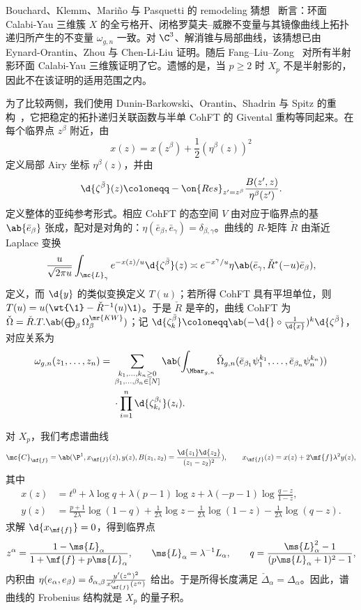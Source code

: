 Bouchard、Klemm、Mari\~{n}o 与 Pasquetti 的 remodeling 猜想~\cite{BKMP2009} 断言：环面 Calabi-Yau 三维簇 \(X\) 的全亏格开、闭格罗莫夫–威滕不变量与其镜像曲线上拓扑递归所产生的不变量 \(\omega_{g,n}\) 一致。对 \(\C^3\)、解消锥与局部曲线，该猜想已由 Eynard-Orantin、Zhou 与 Chen-Li-Liu 证明。随后 Fang--Liu--Zong~\cite{FLZ2020} 对所有半射影环面 Calabi-Yau 三维簇证明了它。遗憾的是，当 \(p \geq 2\) 时 \(X_p\) 不是半射影的，因此不在该证明的适用范围之内。

为了比较两侧，我们使用 Dunin-Barkowski、Orantin、Shadrin 与 Spitz 的重构~\cite{DOSS2014}，它把稳定的拓扑递归关联函数与半单 CohFT 的 Givental 重构等同起来。在每个临界点 \(z^{\beta}\) 附近，由
\[ x(z) = x(z^{\beta}) + \frac{1}{2}(\eta^{\beta}(z))^2 \]
定义局部 Airy 坐标 \(\eta^{\beta}(z)\)，并由
\[ \d{\zeta^{\bar{\beta}}}(z) \coloneqq -\on{Res}_{z'=z^{\beta}}\frac{B(z',z)}{\eta^{\beta}(z')}. \]
定义整体的亚纯参考形式。相应 CohFT 的态空间 \(V\) 由对应于临界点的基 \(\ab\{\bar{e}_{\beta}\}\) 张成，配对是对角的：\(\eta(\bar{e}_{\beta},\bar{e}_{\gamma}) = \delta_{\beta,\gamma}\)。曲线的 \(R\)-矩阵 \(\check{R}\) 由渐近 Laplace 变换
\[ \frac{u}{\sqrt{2\pi u}}\int_{\mc{L}_{\gamma}} e^{-x(z)/u}\d{\zeta^{\bar{\beta}}}(z) \asymp e^{-x^{\gamma}/u}\eta\ab(\bar{e}_{\gamma}, \check{R}^*(-u)\bar{e}_{\beta}), \]
定义，而 \(\d{y}\) 的类似变换定义 \(T(u)\)；若所得 CohFT 具有平坦单位，则 \(T(u) = u(\wt{\1}-\check{R}^{-1}(u)\1)\)。于是 \(\check{R}\) 是辛的，曲线 CohFT 为 \(\check{\Omega} = \check{R}.T.\ab(\bigoplus_{\beta}\Omega^{\mr{KW}}_{\beta})\)；记 \(\d{\zeta^{\bar{\beta}}_k} \coloneqq \ab(-\d{} \circ \frac{1}{\d{x}})^k \d{\zeta^{\bar{\beta}}}\)，对应关系为
\begin{align*}
    \omega_{g,n}(z_1,\ldots,z_n) ={}& \sum_{\substack{k_1,\ldots,k_n \geq 0 \\ \beta_1,\ldots,\beta_n \in [N]}}\ab(\int_{\Mbar_{g,n}} \check{\Omega}_{g,n}(\bar{e}_{\beta_1}\psi_1^{k_1},\ldots,\bar{e}_{\beta_n}\psi_n^{k_n})) \\
    &\cdot \prod_{i=1}^n \d{\zeta^{\beta_i}_{k_i}}(z_i).
\end{align*}

对 \(X_p\)，我们考虑谱曲线
\[ \mc{C}_{\mf{f}} = \ab(\P^1, x_{\mf{f}}(z), y(z), B(z_1,z_2) = \frac{\d{z_1}\d{z_2}}{(z_1-z_2)^2}), \qquad x_{\mf{f}}(z) = x(z) + 2\mf{f}\lambda^2 y(z), \]
其中
\begin{align*}
    x(z) &= t^0 + \lambda \log q + \lambda(p-1)\log z + \lambda(-p-1)\log\frac{q-z}{1-z}, \\
    y(z) &= \frac{p+1}{2\lambda}\log(1-q) + \frac{1}{2\lambda}\log z - \frac{1}{2\lambda}\log(1-z) - \frac{1}{2\lambda}\log(q-z).
\end{align*}
求解 \(\d{x_{\mf{f}}} = 0\)，得到临界点
\[ z^{\alpha} = \frac{1-\ms{L}_{\alpha}}{1+\mf{f}+p\ms{L}_{\alpha}}, \qquad \ms{L}_{\alpha} = \lambda^{-1}L_{\alpha}, \qquad q = \frac{\ms{L}_{\alpha}^2-1}{(p\ms{L}_{\alpha}+1)^2-1}, \]
内积由 \(\eta(e_{\alpha},e_{\beta}) = \delta_{\alpha,\beta}\frac{y'(z^{\alpha})^2}{x''_{\mf{f}}(z^{\alpha})}\) 给出。于是所得长度满足 \(\check{\Delta}_{\alpha} = \Delta_{\alpha}\)。因此，谱曲线的 Frobenius 结构就是 \(X_p\) 的量子积。

